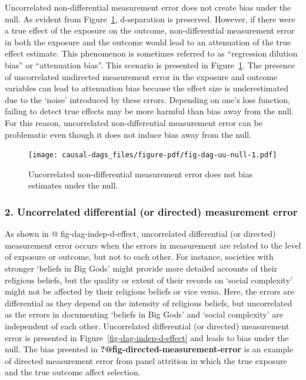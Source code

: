 \documentclass[
  singlecolumn]{report}
\begin{document}
Uncorrelated non-differential measurement error does not create bias
under the null. As evident from Figure~\ref{fig-dag-uu-null},
d-separation is preserved. However, if there were a true effect of the
exposure on the outcome, non-differential measurement error in both the
exposure and the outcome would lead to an attenuation of the true effect
estimate. This phenomenon is sometimes referred to as ``regression
dilution bias'' or ``attenuation bias''. This scenario is presented in
Figure~\ref{fig-dag-uu-null}. The presence of uncorrelated undirected
measurement error in the exposure and outcome variables can lead to
attenuation bias because the effect size is underestimated due to the
`noise' introduced by these errors. Depending on one's loss function,
failing to detect true effects may be more harmful than bias away from
the null. For this reason, uncorrelated non-differential measurement
error can be problematic even though it does not induce bias away from
the null.

\begin{figure}

{\centering \texttt{[image: causal-dags\_files/figure-pdf/fig-dag-uu-null-1.pdf]}

}

\caption{\label{fig-dag-uu-null}Uncorrelated non-differential
measurement error does not bias estimates under the null.}

\end{figure}

\hypertarget{uncorrelated-differential-or-directed-measurement-error}{%
\subsubsection{\texorpdfstring{2. \textbf{Uncorrelated differential (or
directed) measurement
error}}{2. Uncorrelated differential (or directed) measurement error}}\label{uncorrelated-differential-or-directed-measurement-error}}

As shown in @ fig-dag-indep-d-effect, uncorrelated differential (or
directed) measurement error occurs when the errors in measurement are
related to the level of exposure or outcome, but not to each other. For
instance, societies with stronger `beliefs in Big Gods' might provide
more detailed accounts of their religious beliefs, but the quality or
extent of their records on `social complexity' might not be affected by
their religious beliefs or vice versa. Here, the errors are differential
as they depend on the intensity of religious beliefs, but uncorrelated
as the errors in documenting `beliefs in Big Gods' and `social
complexity' are independent of each other. Uncorrelated differential (or
directed) measurement error is presented in
Figure~\ref{fig-dag-indep-d-effect} and leads to bias under the null.
The bias preented in \textbf{?@fig-directed-measurement-error} is an
example of directed measurement error from panel attrition in which the
true exposure and the true outcome affect selection.
\end{document}
